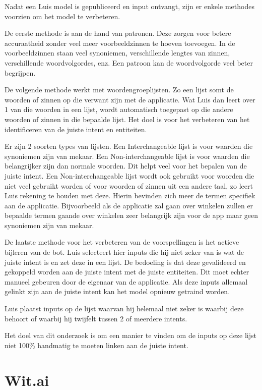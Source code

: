 Nadat een Luis model is gepubliceerd en input ontvangt, zijn er enkele methodes voorzien om het model te verbeteren.

De eerste methode is aan de hand van patronen. Deze zorgen voor betere accuraatheid zonder veel meer voorbeeldzinnen te hoeven toevoegen. In de voorbeeldzinnen staan veel synoniemen, verschillende lengtes van zinnen, verschillende woordvolgordes, enz. Een patroon kan de woordvolgorde veel beter begrijpen.

De volgende methode werkt met woordengroeplijsten. Zo een lijst somt de woorden of zinnen op die verwant zijn met de applicatie. Wat Luis dan leert over 1 van die woorden in een lijst, wordt automatisch toegepast op die andere woorden of zinnen in die bepaalde lijst. Het doel is voor het verbeteren van het identificeren van de juiste intent en entiteiten.

Er zijn 2 soorten types van lijsten. Een Interchangeable lijst is voor waarden die synoniemen zijn van mekaar. Een Non-interchangeable lijst is voor waarden die belangrijker zijn dan normale woorden. Dit helpt veel voor het bepalen van de juiste intent. Een Non-interchangeable lijst wordt ook gebruikt voor woorden die niet veel gebruikt worden of voor woorden of zinnen uit een andere taal, zo leert Luis rekening te houden met deze. Hierin bevinden zich meer de termen specifiek aan de applicatie. Bijvoorbeeld als de applicatie zal gaan over winkelen zullen er bepaalde termen gaande over winkelen zeer belangrijk zijn voor de app maar geen synoniemen zijn van mekaar.

De laatste methode voor het verbeteren van de voorspellingen is het actieve bijleren van de bot. Luis selecteert hier inputs die hij niet zeker van is wat de juiste intent is en zet deze in een lijst. De bedoeling is dat deze gevalideerd en gekoppeld worden aan de juiste intent met de juiste entiteiten. Dit moet echter manueel gebeuren door de eigenaar van de applicatie. Als deze inputs allemaal gelinkt zijn aan de juiste intent kan het model opnieuw getraind worden.

Luis plaatst inputs op de lijst waarvan hij helemaal niet zeker is waarbij deze behoort of waarbij hij twijfelt tussen 2 of meerdere intents.

Het doel van dit onderzoek is om een manier te vinden om de inputs op deze lijst niet 100\% handmatig te moeten linken aan de juiste intent.

\section{Wit.ai}
\label{sec:Wit.ai}

